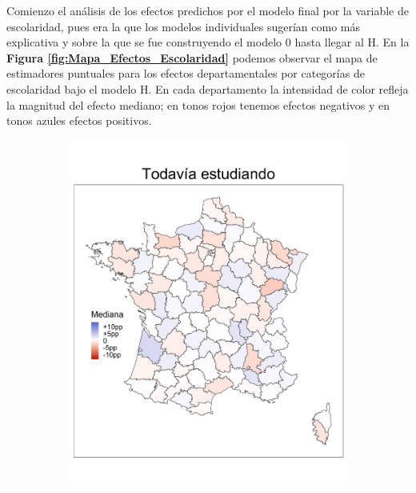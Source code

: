 Comienzo el análisis de los efectos predichos por el modelo final por la variable de escolaridad, pues era la que los modelos individuales sugerían como más explicativa y sobre la que se fue construyendo el modelo 0 hasta llegar al H. En la \textbf{Figura \ref{fig:Mapa_Efectos_Escolaridad}} podemos observar el mapa de estimadores puntuales para los efectos departamentales por categorías de escolaridad bajo el modelo H. En cada departamento la intensidad de color refleja la magnitud del efecto mediano; en tonos rojos tenemos efectos negativos y en tonos azules efectos positivos.\\

\begin{figure}
	\centering
	\begin{subfigure}{0.275\textwidth}
	\includegraphics[width = \textwidth]{Figs/Efectos/Mapa_Efectos_Esc_Modelo_H}
	\end{subfigure}
	~
	\begin{subfigure}{0.275\textwidth}

\end{subfigure}
\end{figure}
